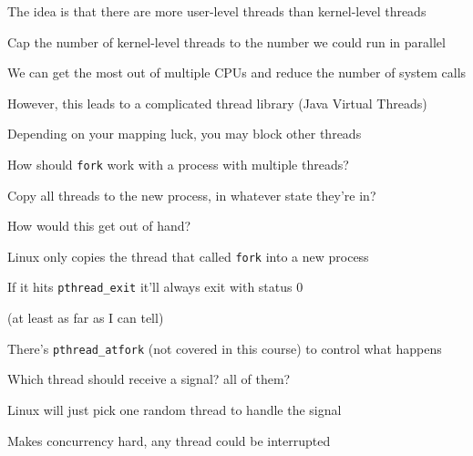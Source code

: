   \begin{slide}


    The idea is that there are more user-level threads than kernel-level threads

    \leftspace{}Cap the number of kernel-level threads to the number we could
    run in parallel
    \medskip

    We can get the most out of multiple CPUs and reduce the number of system
    calls
    \medskip

    However, this leads to a complicated thread library (Java Virtual Threads)

    \leftspace{}Depending on your mapping luck, you may block other threads

  \end{slide}

  \begin{slide}


    How should \texttt{fork} work with a process with multiple threads?

    \leftspace{}Copy all threads to the new process, in whatever state they're
    in?

    \leftspace{}\leftspace{}How would this get out of hand?
    \medskip

    Linux only copies the thread that called \texttt{fork} into a new process

    \leftspace{}If it hits \texttt{pthread\_exit} it'll always exit with
                  status 0

    \leftspace{}\leftspace{}(at least as far as I can tell)
    \medskip

    There's \texttt{pthread\_atfork} (not covered in this course) to control
    what happens

  \end{slide}

  \begin{slide}


    Which thread should receive a signal? all of them?
    \medskip

    Linux will just pick one random thread to handle the signal

    \leftspace{}Makes concurrency hard, any thread could be interrupted

  \end{slide}

